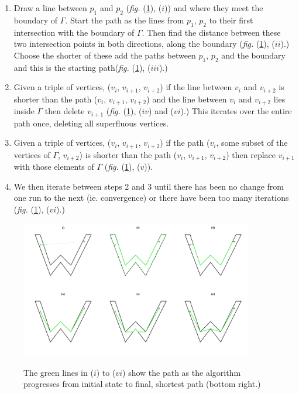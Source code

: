 \documentclass[a4paper,10pt]{amsart}
\newcommand{\fig}[1]{\emph{fig.} (\ref{#1})}
\begin{document}
\begin{enumerate}
\item Draw a line between $p_1$ and $p_2$ (\fig{wdia}, ($i$)) and where they meet the boundary of $\Gamma$. Start the path as the lines from $p_1$, $p_2$ to their first intersection with the boundary of $\Gamma$. Then find the distance between these two intersection points in both directions, along the boundary (\fig{wdia}, ($ii$).) Choose the shorter of these add the paths between $p_1$, $p_2$ and the boundary and this is the starting path(\fig{wdia}, ($iii$).) 
\item Given a triple of vertices, ($v_i$, $v_{i+1}$, $v_{i+2}$) if the line between $v_i$ and $v_{i+2}$ is shorter than the path ($v_i$, $v_{i+1}$, $v_{i+2}$) and the line between $v_i$ and $v_{i+2}$ lies inside $\Gamma$ then delete $v_{i+1}$ (\fig{wdia}, ($iv$) and ($vi$).) This iterates over the entire path once, deleting all superfluous vertices. 
\item Given a triple of vertices, ($v_i$, $v_{i+1}$, $v_{i+2}$) if the path ($v_i$, some subset of the vertices of $\Gamma$, $v_{i+2}$) is shorter than the path ($v_i$, $v_{i+1}$, $v_{i+2}$) then replace $v_{i+1}$ with those elements of $\Gamma$ (\fig{wdia}, ($v$)). 
\item We then iterate between steps 2 and 3 until there has been no change from one run to the next (ie. convergence) or there have been too many iterations (\fig{wdia}, ($vi$).)
\end{enumerate}

\begin{figure}
\centering
\includegraphics[trim=0in 0.5in 0in 0.25in, width=4in]{figs/wdia.pdf} \\
\caption{The green lines in ($i$) to ($vi$) show the path as the algorithm progresses from initial state to final, shortest path (bottom right.) }
\label{wdia}
\end{figure}
\end{document}
